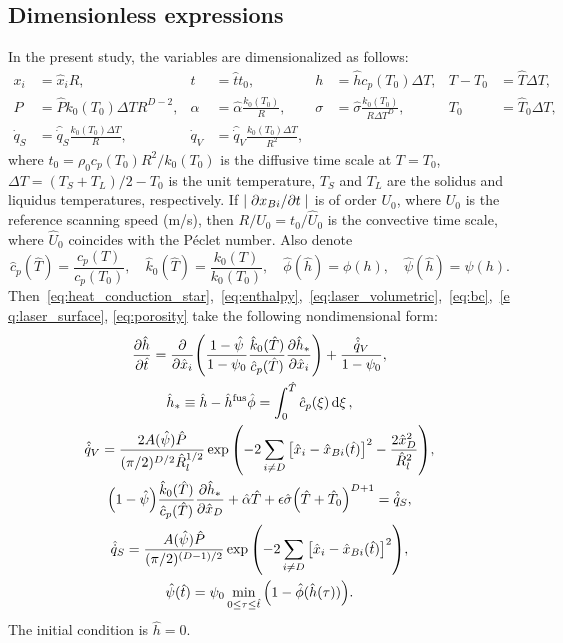 \documentclass{article}
\newcommand{\fusion}[1]{{#1}^\mathrm{fus}}
\newcommand{\Hx}{\hat{x}}
\newcommand{\Ht}{\hat{t}}
\newcommand{\Hh}{\hat{h}}
\newcommand{\HT}{\hat{T}}
\newcommand{\HP}{\hat{P}}
\newcommand{\Halpha}{\hat{\alpha}}
\newcommand{\Hsigma}{\hat{\sigma}}
\newcommand{\Hc}{\hat{c}}
\newcommand{\Hk}{\hat{k}}
\newcommand{\Hphi}{\hat{\phi}}
\newcommand{\Hpsi}{\hat{\psi}}
\newcommand{\HR}{\hat{R}}
\newcommand{\HU}{\hat{U}}
\newcommand{\Hq}{\hat{\dot{q}}}
\begin{document}
\subsection{Dimensionless expressions}

In the present study, the variables are dimensionalized as follows:
\begin{equation}\label{eq:dimensionless}
    \begin{aligned}
        x_i &= \Hx_iR, & t &= \Ht t_0, & h &= \Hh c_p(T_0)\Delta{T}, & T - T_0 &= \HT\Delta{T}, \\
        P &= \HP k_0(T_0)\Delta{T}R^{D-2}, & \alpha &= \Halpha\frac{k_0(T_0)}R, &
            \sigma &= \Hsigma\frac{k_0(T_0)}{R\Delta{T}^D}, & T_0 &= \HT_0\Delta{T}, \\
        \dot{q}_S &= \Hq_S\frac{k_0(T_0)\Delta{T}}{R}, & \dot{q}_V &= \Hq_V\frac{k_0(T_0)\Delta{T}}{R^2},
    \end{aligned}
\end{equation}
where \(t_0 = \rho_0 c_p(T_0) R^2/k_0(T_0)\) is the diffusive time scale at \(T=T_0\),
\(\Delta{T} = (T_S+T_L)/2 - T_0\) is the unit temperature,
\(T_S\) and \(T_L\) are the solidus and liquidus temperatures, respectively.
If \(|\pdv*{x_{Bi}}{t}|\) is of order \(U_0\), where \(U_0\) is the reference scanning speed (\si{m/s}),
then \(R/U_0=t_0/\HU_0\) is the convective time scale, where \(\HU_0\) coincides with the P\'eclet number. Also denote
\begin{equation}\label{eq:dimensionless2}
    \Hc_p(\HT) = \frac{c_p(T)}{c_p(T_0)}, \quad
    \Hk_0(\HT) = \frac{k_0(T)}{k_0(T_0)}, \quad
    \Hphi(\Hh) = \phi(h), \quad
    \Hpsi(\Hh) = \psi(h).
\end{equation}
Then~\eqref{eq:heat_conduction_star},~\eqref{eq:enthalpy},~\eqref{eq:laser_volumetric},~\eqref{eq:bc},~\eqref{eq:laser_surface},
\eqref{eq:porosity} take the following nondimensional form:
\begin{gather}
    \pdv{\Hh}{\Ht} = \pdv{\Hx_i}\qty(
        \frac{1-\Hpsi}{1-\psi_0}
        \frac{\Hk_0(\HT)}{\Hc_p(\HT)}\pdv{\Hh_*}{\Hx_i}
    ) + \frac{\Hq_V}{1-\psi_0}, \label{eq:heat_conduction_hats} \\
    \Hh_* \equiv \Hh - \fusion{\Hh}\Hphi = \int_0^{\HT} \Hc_p(\xi)\dd{\xi}, \label{eq:enthalpy_hats} \\
    \Hq_V = \frac{2A(\Hpsi)\HP}{(\pi/2)^{D/2}\HR_l^{1/2}}
        \exp\qty( -2\sum_{i\neq D}\qty[\Hx_i-\Hx_{Bi}(\Ht)]^2 - \frac{2\Hx_D^2}{\HR_l^2} ), \label{eq:laser_volumetric_hats} \\
    \qty(1-\Hpsi) \frac{\Hk_0(\HT)}{\Hc_p(\HT)}\pdv{\Hh_*}{\Hx_D} +
        \Halpha\HT + \epsilon\Hsigma \qty(\HT + \HT_0)^{D+1} = \Hq_S, \label{eq:bc_hats} \\
    \Hq_S = \frac{A(\Hpsi)\HP}{(\pi/2)^{(D-1)/2}}
        \exp\qty( -2\sum_{i\neq D}\qty[\Hx_i-\Hx_{Bi}(\Ht)]^2 ), \label{eq:laser_surface_hats} \\
    \Hpsi(\Ht) = \psi_0\min_{0\leq\tau\leq \Ht}\qty( 1-\Hphi(\Hh(\tau)) ). \label{eq:porosity_hats}
\end{gather}
The initial condition is \(\Hh = 0\).
\end{document}
